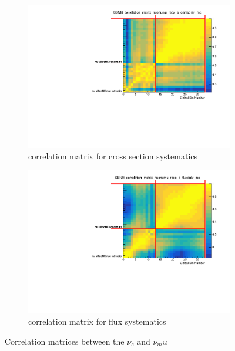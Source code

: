\documentclass[a4paper]{article}
\begin{document}
\begin{figure}[ht] 
\begin{center}
    \begin{subfigure}[b]{0.45\textwidth}
    \centering
    \includegraphics[width=1.00\textwidth]{Sensitivity/numuconstraint/SBNfit_correlation_matrix_nuenumu_reco_e_genieonly_mc_collapsed.pdf}
    \caption{correlation matrix for cross section systematics}
    \end{subfigure}
    \begin{subfigure}[b]{0.45\textwidth}
    \centering
    \includegraphics[width=1.00\textwidth]{Sensitivity/numuconstraint/SBNfit_correlation_matrix_nuenumu_reco_e_fluxonly_mc_collapsed.pdf}
    \caption{correlation matrix for flux systematics}
    \end{subfigure}
\caption{\label{fig:fluxmatrices} Correlation matrices between the $\nu_e$ and $\nu_mu$}
\end{center}
\end{figure}
\end{document}
